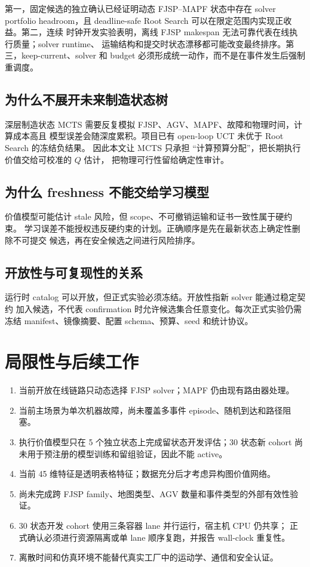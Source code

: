 \documentclass[11pt,a4paper]{article}
\begin{document}
第一，固定候选的独立确认已经证明动态 FJSP--MAPF 状态中存在 solver portfolio
headroom，且 deadline-safe Root Search 可以在限定范围内实现正收益。第二，连续
时钟开发实验表明，离线 FJSP makespan 无法可靠代表在线执行质量；solver runtime、
运输结构和提交时状态漂移都可能改变最终排序。第三，keep-current、solver 和 budget
必须形成统一动作，而不是在事件发生后强制重调度。

\subsection{为什么不展开未来制造状态树}

深层制造状态 MCTS 需要反复模拟 FJSP、AGV、MAPF、故障和物理时间，计算成本高且
模型误差会随深度累积。项目已有 open-loop UCT 未优于 Root Search 的冻结负结果。
因此本文让 MCTS 只承担 ``计算预算分配''，把长期执行价值交给可校准的 \(Q\) 估计，
把物理可行性留给确定性审计。

\subsection{为什么 freshness 不能交给学习模型}

价值模型可能估计 stale 风险，但 scope、不可撤销运输和证书一致性属于硬约束。
学习误差不能授权违反硬约束的计划。正确顺序是先在最新状态上确定性删除不可提交
候选，再在安全候选之间进行风险排序。

\subsection{开放性与可复现性的关系}

运行时 catalog 可以开放，但正式实验必须冻结。开放性指新 solver 能通过稳定契约
加入候选，不代表 confirmation 时允许候选集合任意变化。每次正式实验仍需冻结
manifest、镜像摘要、配置 schema、预算、seed 和统计协议。

\section{局限性与后续工作}
\label{sec:limitations}

\begin{enumerate}
    \item 当前开放在线链路只动态选择 FJSP solver；MAPF 仍由现有路由器处理。
    \item 当前主场景为单次机器故障，尚未覆盖多事件 episode、随机到达和路径阻塞。
    \item 执行价值模型只在 5 个独立状态上完成留状态开发评估；30 状态新 cohort
    尚未用于预注册的模型训练和留组验证，因此不能 active。
    \item 当前 45 维特征是透明表格特征；数据充分后才考虑异构图价值网络。
    \item 尚未完成跨 FJSP family、地图类型、AGV 数量和事件类型的外部有效性验证。
    \item 30 状态开发 cohort 使用三条容器 lane 并行运行，宿主机 CPU 仍共享；
    正式确认必须进行资源隔离或单 lane 顺序复跑，并报告 wall-clock 重复性。
    \item 离散时间和仿真环境不能替代真实工厂中的运动学、通信和安全认证。
\end{enumerate}
\end{document}
